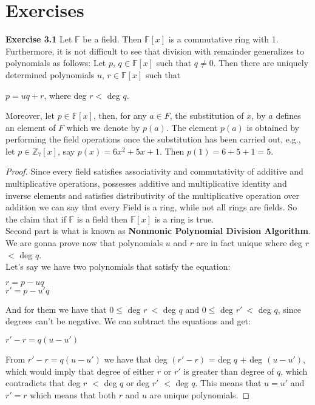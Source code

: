 \documentclass[a4paper]{article}
\begin{document}
\section{Exercises}
\noindent \textbf{Exercise 3.1} Let $\mathbb{F}$ be a field. Then $\mathbb{F}[x]$ is a commutative ring with 1. Furthermore, it is not difficult to see that division with remainder generalizes to polynomials as follows: Let $p$, $q \in \mathbb{F}[x]$ such that $q \neq0$. Then there are uniquely determined polynomials $u$, $r \in \mathbb{F}[x]$ such that
\begin{center}
$p = uq + r$, where deg $r<$ deg $q$.	
\end{center}
Moreover, let $p \in \mathbb{F}[x]$, then, for any $a \in F$, the substitution of $x$, by $a$ defines an element of $F$ which we denote by $p(a)$. The element $p(a)$ is obtained by performing the field operations once the substitution has been carried out, e.g., let $p \in \mathbb{Z}_{7}[x]$, say $p(x) = 6x^{2} + 5x + 1$. Then $p(1) = 6 + 5 + 1 = 5$.
\begin{proof}
Since every field satisfies associativity and commutativity of additive and multiplicative operations, possesses additive and multiplicative identity and inverse elements and satisfies distributivity of the multiplicative operation over addition we can say that every Field is a ring, while not all rings are fields. So the claim that if $\mathbb{F}$ is a field then $\mathbb{F}[x]$ is a ring is true.\\
Second part is what is known as \textbf{Nonmonic Polynomial Division Algorithm}. We are gonna prove now that polynomials $u$ and $r$ are in fact unique where deg $r$ $<$ deg $q$.\\
Let's say we have two polynomials that satisfy the equation:
\begin{center}
$r = p - uq$\\
$r' = p - u'q$	
\end{center}
And for them we have that $0 \leq $ deg $r\ <$ deg $q$ and $0 \leq $ deg $r'\ <$ deg $q$, since degrees can't be negative. We can subtract the equations and get:
\begin{center}
$r' - r	= q(u - u')$
\end{center}
From $r' - r	= q(u - u')$ we have that deg $(r' - r)$ = deg $q$ + deg $(u - u')$, which would imply that degree of either $r$ or $r'$ is greater than degree of $q$, which contradicts that deg $r$ $<$ deg $q$ or deg $r'$ $<$ deg $q$. This means that $u=u'$ and $r'=r$ which means that both $r$ and $u$ are unique polynomials.

\end{proof}
\end{document}
